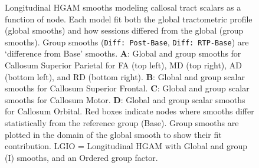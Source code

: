 \documentclass[12pt]{article}
\begin{document}
\begin{figure}[H]
	\centering
	\caption{Longitudinal HGAM smooths modeling callosal tract scalars as a function of node. Each model fit both the global tractometric profile (global smooths) and how sessions differed from the global (group smooths). Group smooths (\lstinline{Diff: Post-Base}, \lstinline{Diff: RTP-Base}) are `difference from Base' smooths. \textbf{A}: Global and group smooths for Callosum Superior Parietal for FA (top left), MD (top right), AD (bottom left), and RD (bottom right). \textbf{B}: Global and group scalar smooths for Callosum Superior Frontal. \textbf{C}: Global and group scalar smooths for Callosum Motor. \textbf{D}: Global and group scalar smooths for Callosum Orbital. Red boxes indicate nodes where smooths differ statistically from the reference group (Base). Group smooths are plotted in the domain of the global smooth to show their fit contribution. LGIO = Longitudinal HGAM with Global and group (I) smooths, and an Ordered group factor.}
	\label{fig:lgio-gam-cc}
\end{figure}
\end{document}
